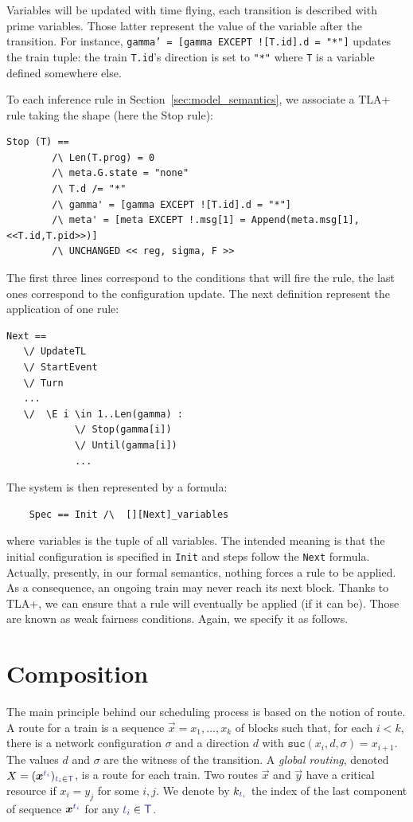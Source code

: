 \documentclass[runningheads]{llncs}
\newcommand{\sucblock}{{\mathtt{suc}}}
\newcommand{\trainFmt}[1]{{\color{traincolor} #1}}
\newcommand{\trains}{{\trainFmt{\mathsf{T}}}}
\newcommand{\tid}[1]{\ensuremath{\trainFmt{t_{#1}}}}
\begin{document}
Variables will be updated with time flying, each transition is described with prime variables. Those latter represent the value of the variable after the transition. For instance, \texttt{gamma' = [gamma EXCEPT ![T.id].d = "*"]} updates the train tuple: the train \texttt{T.id}'s direction is set to \texttt{"*"} where  \texttt{T} is a variable  defined somewhere else. 

To each inference rule in Section~\ref{sec:model_semantics}, we associate a TLA+ rule taking the shape (here the Stop rule): 
\begin{verbatim}
Stop (T) ==
        /\ Len(T.prog) = 0
        /\ meta.G.state = "none"
        /\ T.d /= "*"
        /\ gamma' = [gamma EXCEPT ![T.id].d = "*"]
        /\ meta' = [meta EXCEPT !.msg[1] = Append(meta.msg[1],<<T.id,T.pid>>)]
        /\ UNCHANGED << reg, sigma, F >>
 \end{verbatim}
The first three lines correspond to the conditions that will fire the rule, the last ones correspond to the configuration update. The next definition represent the application of one rule:
\begin{verbatim}
Next == 
   \/ UpdateTL
   \/ StartEvent
   \/ Turn
   ...
   \/  \E i \in 1..Len(gamma) :
            \/ Stop(gamma[i])
            \/ Until(gamma[i])
            ...
\end{verbatim}       
        
The system is then represented by a formula:
\begin{verbatim}
    Spec == Init /\  [][Next]_variables
\end{verbatim}%
where variables is the tuple of all variables. The intended meaning is that the initial configuration is specified in \texttt{Init} and steps follow the \texttt{Next} formula.  Actually, presently, in our formal semantics, nothing forces a rule to be applied. As a consequence, an ongoing train may never reach its next block. Thanks to TLA+, we can ensure that a rule will eventually be applied (if it can be). Those are known as weak fairness conditions. Again, we specify it as follows. 


\section{Composition}
\label{sec:composition}

The main principle behind our scheduling process is based on the notion of route. A route for a train is a sequence $\vec{x} = x_1, \ldots, x_k$ of blocks such that, for each $i < k$, there is a network configuration $\sigma$  and a direction $d$ with $\sucblock(x_i, d, \sigma) = x_{i+1}$.  The values $d$ and $\sigma$ are the witness of the transition. A \emph{global routing}, denoted $X = (\vec{x}^{\tid{i}})_{\tid{i} \in \trains}$, is a route for each train.  Two routes $\vec{x}$ and $\vec{y}$ have a critical resource if  $x_i = y_j$ for some $i,j$. We denote by $k_{\tid{i}}$ the index of the last component of sequence $\vec{x}^\tid{i}$ for any $\tid{i}\in \trains$. 
\end{document}
